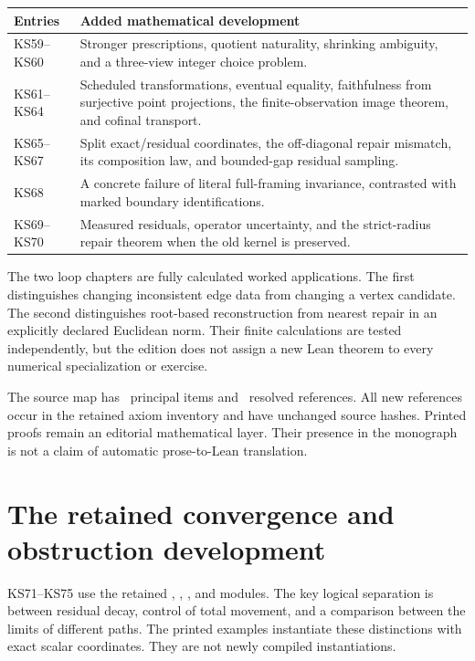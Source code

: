 \documentclass[11pt]{article}
\begin{document}
\begin{center}
\begin{tabularx}{\linewidth}{@{}p{.18\linewidth}X@{}}
\toprule Entries & Added mathematical development\\\midrule
KS59--KS60 & Stronger prescriptions, quotient naturality, shrinking ambiguity, and a three-view integer choice problem.\\
KS61--KS64 & Scheduled transformations, eventual equality, faithfulness from surjective point projections, the finite-observation image theorem, and cofinal transport.\\
KS65--KS67 & Split exact/residual coordinates, the off-diagonal repair mismatch, its composition law, and bounded-gap residual sampling.\\
KS68 & A concrete failure of literal full-framing invariance, contrasted with marked boundary identifications.\\
KS69--KS70 & Measured residuals, operator uncertainty, and the strict-radius repair theorem when the old kernel is preserved.\\
\bottomrule
\end{tabularx}
\end{center}

The two loop chapters are fully calculated worked applications. The first distinguishes changing inconsistent edge data from changing a vertex candidate. The second distinguishes root-based reconstruction from nearest repair in an explicitly declared Euclidean norm. Their finite calculations are tested independently, but the edition does not assign a new Lean theorem to every numerical specialization or exercise.

The source map has \EditionClaims\ principal items and \EditionReferences\ resolved references. All new references occur in the retained axiom inventory and have unchanged source hashes. Printed proofs remain an editorial mathematical layer. Their presence in the monograph is not a claim of automatic prose-to-Lean translation.

\section{The retained convergence and obstruction development}
KS71--KS75 use the retained , , , and  modules. The key logical separation is between residual decay, control of total movement, and a comparison between the limits of different paths. The printed examples instantiate these distinctions with exact scalar coordinates. They are not newly compiled instantiations.
\end{document}
